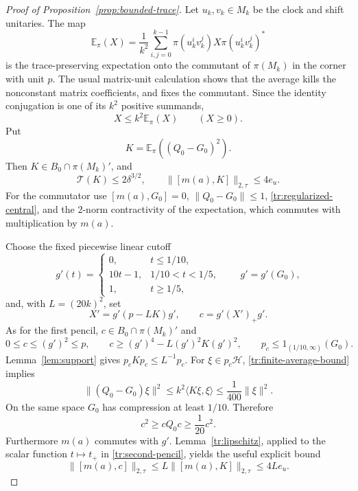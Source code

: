\begin{proof}[Proof of Proposition~\ref{prop:bounded-trace}]
Let $u_k,v_k\in M_k$ be the clock and shift unitaries.  The map
\[
 \mathbb E_\pi(X)=\frac1{k^2}\sum_{i,j=0}^{k-1}
       \pi(u_k^iv_k^j)X\pi(u_k^iv_k^j)^*
\]
is the trace-preserving expectation onto the commutant of $\pi(M_k)$
in the corner with unit $p$.  The usual matrix-unit calculation shows
that the average kills the nonconstant matrix coefficients, and fixes
the commutant.  Since the identity conjugation is one of its $k^2$
positive summands,
\begin{equation}\label{tr:finite-average-bound}
 X\leq k^2\mathbb E_\pi(X)\qquad(X\geq0).
\end{equation}
Put
\[
 K=\mathbb E_\pi((Q_0-G_0)^2).
\]
Then $K\in B_0\cap\pi(M_k)'$, and
\begin{equation}\label{tr:second-cost}
 \mathcal T(K)\leq2\delta^{3/2},\qquad
 \|[m(a),K]\|_{2,\tau}\leq4e_u.
\end{equation}
For the commutator use $[m(a),G_0]=0$, $\|Q_0-G_0\|\leq1$,
\eqref{tr:regularized-central}, and the $2$-norm contractivity of the
expectation, which commutes with multiplication by $m(a)$.

Choose the fixed piecewise linear cutoff
\[
 g'(t)=\begin{cases}
 0,&t\leq1/10,\\
 10t-1,&1/10<t<1/5,\\
 1,&t\geq1/5,
 \end{cases}
 \qquad g'=g'(G_0),
\]
and, with $L=(20k)^2$, set
\begin{equation}\label{tr:second-pencil}
 X'=g'(p-LK)g',\qquad c=g'(X')_+g'.
\end{equation}
As for the first pencil, $c\in B_0\cap\pi(M_k)'$ and
\begin{equation}\label{tr:second-pencil-bounds}
 0\leq c\leq(g')^2\leq p,\qquad
 c\geq(g')^4-L(g')^2K(g')^2,
 \qquad p_c\leq1_{(1/10,\infty)}(G_0).
\end{equation}
Lemma~\ref{lem:support} gives $p_cKp_c\leq L^{-1}p_c$.
For $\xi\in p_c\mathcal H$, \eqref{tr:finite-average-bound} implies
\[
 \|(Q_0-G_0)\xi\|^2
 \leq k^2\langle K\xi,\xi\rangle
 \leq\frac1{400}\|\xi\|^2.
\]
On the same space $G_0$ has compression at least $1/10$.  Therefore
\begin{equation}\label{tr:polar-lower}
 c^2\geq cQ_0c\geq\frac1{20}c^2.
\end{equation}
Furthermore $m(a)$ commutes with $g'$.  Lemma~\ref{tr:lipschitz},
applied to the scalar function $t\mapsto t_+$ in
\eqref{tr:second-pencil}, yields the useful explicit bound
\begin{equation}\label{tr:c-commutator}
 \|[m(a),c]\|_{2,\tau}
 \leq L\|[m(a),K]\|_{2,\tau}\leq4Le_u.
\end{equation}


\end{proof}
